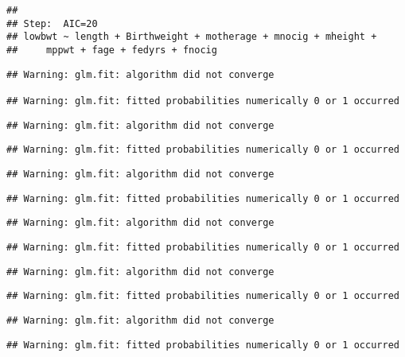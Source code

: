 \documentclass[]{article}
\begin{document}
\begin{verbatim}
## 
## Step:  AIC=20
## lowbwt ~ length + Birthweight + motherage + mnocig + mheight + 
##     mppwt + fage + fedyrs + fnocig
\end{verbatim}

\begin{verbatim}
## Warning: glm.fit: algorithm did not converge

## Warning: glm.fit: fitted probabilities numerically 0 or 1 occurred
\end{verbatim}

\begin{verbatim}
## Warning: glm.fit: algorithm did not converge
\end{verbatim}

\begin{verbatim}
## Warning: glm.fit: fitted probabilities numerically 0 or 1 occurred
\end{verbatim}

\begin{verbatim}
## Warning: glm.fit: algorithm did not converge
\end{verbatim}

\begin{verbatim}
## Warning: glm.fit: fitted probabilities numerically 0 or 1 occurred
\end{verbatim}

\begin{verbatim}
## Warning: glm.fit: algorithm did not converge
\end{verbatim}

\begin{verbatim}
## Warning: glm.fit: fitted probabilities numerically 0 or 1 occurred
\end{verbatim}

\begin{verbatim}
## Warning: glm.fit: algorithm did not converge
\end{verbatim}

\begin{verbatim}
## Warning: glm.fit: fitted probabilities numerically 0 or 1 occurred
\end{verbatim}

\begin{verbatim}
## Warning: glm.fit: algorithm did not converge
\end{verbatim}

\begin{verbatim}
## Warning: glm.fit: fitted probabilities numerically 0 or 1 occurred
\end{verbatim}
\end{document}
